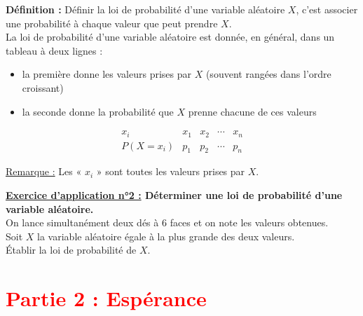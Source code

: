\documentclass[12pt]{article}
\begin{document}
\begin{mdframed}[
    linewidth=1pt,
    roundcorner=5pt,
    linecolor=ForestGreen
]
{\color{ForestGreen}\textbf{Définition :}}
Définir la loi de probabilité d'une variable aléatoire $X$, c'est associer une 
probabilité à chaque valeur que peut prendre $X$.
\vspace{10pt}
\\La loi de probabilité d'une variable aléatoire est donnée, en général, 
dans un tableau à deux lignes :
\begin{itemize}
    \item la première donne les valeurs prises par $X$ (souvent rangées dans l'ordre 
    croissant)
    \item la seconde donne la probabilité que $X$ prenne chacune de ces valeurs
\end{itemize}
\vspace{10pt}
\[
\renewcommand{\arraystretch}{1.5}
\begin{array}{c|c|c|c|c}
x_i            & x_1 & x_2 & \cdots & x_n \\ \hline
P(X = x_i)     & p_1 & p_2 & \cdots & p_n
\end{array}
\]
\end{mdframed}

\underline{Remarque :} Les « $x_i$ » sont toutes les valeurs prises par $X$.

\vspace{10pt}
\begin{mdframed}[
    linewidth=1pt,
    roundcorner=5pt,
    linecolor=RoyalBlue,
    innertopmargin=10pt,
    innerbottommargin=10pt
]
{\color{RoyalBlue}\textbf{\underline{Exercice d'application n°2 :} Déterminer une loi de probabilité 
d’une variable aléatoire.}}
\vspace{5pt}
\\
On lance simultanément deux dés à 6 faces et on note les valeurs
obtenues.
\\Soit $X$ la variable aléatoire égale à la plus grande des deux valeurs.
\vspace{5pt}
\\Établir la loi de probabilité de $X$.

\end{mdframed}

\vspace{5pt}


\section*{\textcolor{red}{Partie 2 : Espérance}}
\end{document}
